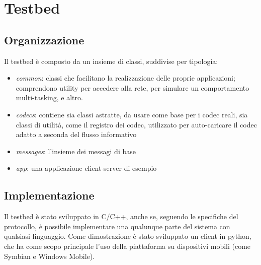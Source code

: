 \section{Testbed}



\subsection{Organizzazione}


Il testbed è composto da un insieme di classi, suddivise per tipologia:



\begin{itemize}
\item \emph{common}: classi che facilitano la realizzazione delle proprie
applicazioni; comprendono utility per accedere alla rete, per simulare un comportamento multi-tasking, e altro.

\item \emph{codecs}: contiene sia classi astratte, da usare come base per i
codec reali, sia classi di utilità, come il registro dei codec, utilizzato per auto-caricare il codec adatto a seconda del flusso informativo

\item \emph{messages}: l'insieme dei messagi di base
\item \emph{app}: una applicazione client-server di esempio
\end{itemize}




\subsection{Implementazione}


Il testbed è stato sviluppato in C/C++, anche se, seguendo le specifiche del
protocollo, è possibile implementare una qualunque parte del sistema con
qualsiasi linguaggio. Come dimostrazione è stato sviluppato un client in
python, che ha come scopo principale l'uso della piattaforma su dispositivi
mobili (come Symbian e Windows Mobile).









